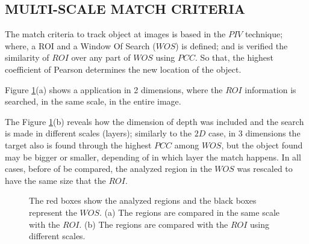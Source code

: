 
\subsection{MULTI-SCALE MATCH CRITERIA}
The match criteria to track object at images is based in the $PIV$ technique; 
where, a ROI and a Window Of Search ($WOS$) is defined; and is 
verified the similarity of $ROI$ over any part of $WOS$ using $PCC$. 
So that, the highest coefficient of Pearson determines the new location of the object.

Figure \ref{fig:multires}(a) shows a application in 2 dimensions, where
the $ROI$ information is searched, in the same scale,  in the entire image.

The Figure \ref{fig:multires}(b) reveals how the dimension of depth was included and
the search is made in different scales (layers); similarly to the $2D$ case, 
in 3 dimensions the target 
also is found through the highest $PCC$ among $WOS$, but the object found may be 
bigger or smaller, depending of in which layer the match happens. 
In all cases, before of be compared, the analyzed region in the $WOS$ was 
rescaled to have the same size that the $ROI$.

\begin{figure}[H]
\centering
  \caption{The red boxes show the analyzed regions and the black boxes represent the $WOS$. 
  (a) The regions are compared in the same scale with the $ROI$. 
  (b) The regions are compared with the $ROI$  using different scales.}
  \label{fig:multires}
\end{figure}




